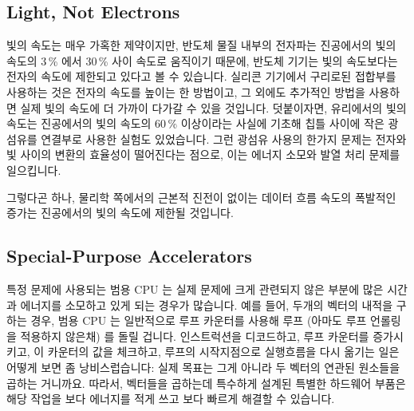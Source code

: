 \subsection{Light, Not Electrons}
\label{sec:cpu:Light, Not Electrons}

빛의 속도는 매우 가혹한 제약이지만, 반도체 물질 내부의 전자파는 진공에서의 빛의
속도의 3\,\% 에서 30\,\% 사이 속도로 움직이기 때문에, 반도체 기기는 빛의 속도보다는
전자의 속도에 제한되고 있다고 볼 수 있습니다.
실리콘 기기에서 구리로된 접합부를 사용하는 것은 전자의 속도를 높이는 한
방법이고, 그 외에도 추가적인 방법을 사용하면 실제 빛의 속도에 더 가까이 다가갈
수 있을 것입니다.
덧붙이자면, 유리에서의 빛의 속도는 진공에서의 빛의 속도의 60\,\% 이상이라는
사실에 기초해 칩틀 사이에 작은 광섬유를 연결부로 사용한 실험도 있었습니다.
그런 광섬유 사용의 한가지 문제는 전자와 빛 사이의 변환의 효율성이 떨어진다는
점으로, 이는 에너지 소모와 발열 처리 문제를 일으킵니다.

그렇다곤 하나, 물리학 쪽에서의 근본적 진전이 없이는 데이터 흐름 속도의 폭발적인
증가는 진공에서의 빛의 속도에 제한될 것입니다.

\iffalse
Although the speed of light would be a hard limit, the fact is that
semiconductor devices are limited by the speed of electricity rather
than that of light, given that electric waves in semiconductor materials
move at between 3\,\% and 30\,\% of the speed of light in a vacuum.
The use of copper connections on silicon devices is one way to increase
the speed of electricity, and it is quite possible that additional
advances will push closer still to the actual speed of light.
In addition, there have been some experiments with tiny optical fibers
as interconnects within and between chips, based on the fact that
the speed of light in glass is more than 60\,\% of the speed of light
in a vacuum.
One obstacle to such optical fibers is the inefficiency conversion
between electricity and light and vice versa, resulting in both
power-consumption and heat-dissipation problems.

That said, absent some fundamental advances in the field of physics,
any exponential increases in the speed of data flow
will be sharply limited by the actual speed of light in a vacuum.
\fi

\subsection{Special-Purpose Accelerators}
\label{sec:cpu:Special-Purpose Accelerators}

특정 문제에 사용되는 범용 CPU 는 실제 문제에 크게 관련되지 않은 부분에 많은
시간과 에너지를 소모하고 있게 되는 경우가 많습니다.
예를 들어, 두개의 벡터의 내적을 구하는 경우, 범용 CPU 는 일반적으로 루프
카운터를 사용해 루프 (아마도 루프 언롤링을 적용하지 않은채) 를 돌릴 겁니다.
인스트럭션을 디코드하고, 루프 카운터를 증가시키고, 이 카운터의 값을 체크하고,
루프의 시작지점으로 실행흐름을 다시 옮기는 일은 어떻게 보면 좀 낭비스럽습니다:
실제 목표는 그게 아니라 두 벡터의 연관된 원소들을 곱하는 거니까요.
따라서, 벡터들을 곱하는데 특수하게 설계된 특별한 하드웨어 부품은 해당 작업을
보다 에너지를 적게 쓰고 보다 빠르게 해결할 수 있습니다.

